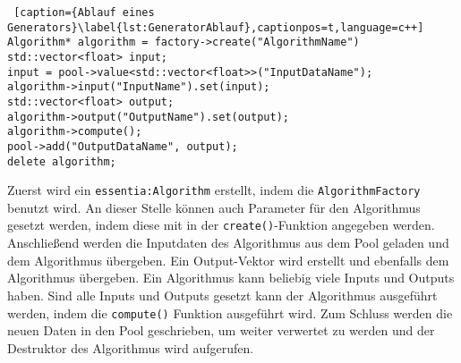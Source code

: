 \documentclass[11pt,a4paper]{article}
\begin{document}
\begin{lstlisting} [caption={Ablauf eines Generators}\label{lst:GeneratorAblauf},captionpos=t,language=c++]
Algorithm* algorithm = factory->create("AlgorithmName")
std::vector<float> input;
input = pool->value<std::vector<float>>("InputDataName");
algorithm->input("InputName").set(input);
std::vector<float> output;
algorithm->output("OutputName").set(output);
algorithm->compute();
pool->add("OutputDataName", output);
delete algorithm;
\end{lstlisting}
\noindent
Zuerst wird ein \lstinline!essentia:Algorithm! erstellt, indem die \lstinline!AlgorithmFactory! benutzt wird. An dieser Stelle können auch Parameter für den Algorithmus gesetzt werden, indem diese mit in der \lstinline!create()!-Funktion angegeben werden. Anschließend werden die Inputdaten des Algorithmus aus dem Pool geladen und dem Algorithmus übergeben. Ein Output-Vektor wird erstellt und ebenfalls dem Algorithmus übergeben. Ein Algorithmus kann beliebig viele Inputs und Outputs haben. Sind alle Inputs und Outputs gesetzt kann der Algorithmus ausgeführt werden, indem die \lstinline!compute()! Funktion ausgeführt wird. Zum Schluss werden die neuen Daten in den Pool geschrieben, um weiter verwertet zu werden und der Destruktor des Algorithmus wird aufgerufen.
\end{document}
